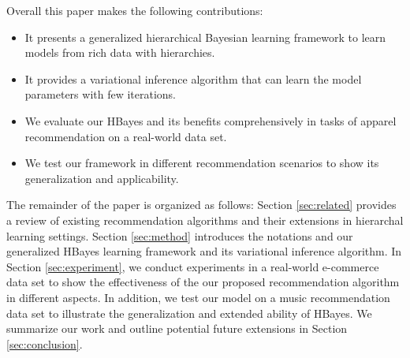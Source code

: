 Overall this paper makes the following contributions:

\begin{itemize}
\item It presents a generalized hierarchical Bayesian learning framework to learn models from rich data with hierarchies.
\item It provides a variational inference algorithm that can learn the model parameters with few iterations.
\item We evaluate our HBayes and its benefits comprehensively in tasks of apparel recommendation on a real-world data set. 
\item We test our framework in different recommendation scenarios to show its generalization and applicability.
\end{itemize}

The remainder of the paper is organized as follows: Section \ref{sec:related} provides a review of existing recommendation algorithms and their extensions in hierarchal learning settings. Section \ref{sec:method} introduces the notations and our generalized HBayes learning framework and its variational inference algorithm. In Section \ref{sec:experiment}, we conduct experiments in a real-world e-commerce data set to show the effectiveness of the our proposed recommendation algorithm in different aspects. In addition, we test our model on a music recommendation data set to illustrate the generalization and extended ability of HBayes. We summarize our work and outline potential future extensions in Section \ref{sec:conclusion}.


